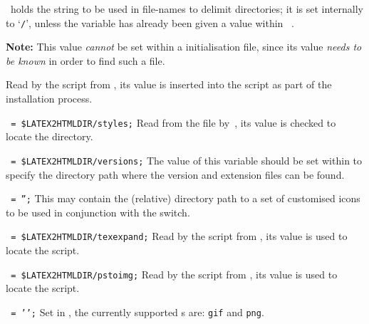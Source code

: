 \begin{htmllist}%
%
%
\item [\fn{\$dd} ]
~holds the string to be used in file-names to delimit directories;
it is set internally to `\texttt{/}', unless the variable has already been given
a value within ~.

\noindent
\textbf{Note:} This value \emph{cannot} be set within a 
initialisation file, since its value \emph{needs to be known}
in order to find such a file.

%
\item [\fn{\$LATEX2HTMLDIR}] \latex{ }%
Read by the  script from ,
its value is inserted into the  \Perl{} script as part
of the installation process.

\item [\fn{\$LATEX2HTMLSTYLES}\texttt{ = \char34\$LATEX2HTMLDIR/styles\char34;}]
Read from the  file by \,,
its value is checked to locate the  directory.

\item [\fn{\$LATEX2HTMLVERSIONS}\texttt{ = \char34\$LATEX2HTMLDIR/versions\char34;}]
The value of this variable should be set within 
to specify the directory path where the version and extension files can be found.

\item [\fn{\$ALTERNATIVE\_ICONS}\texttt{ = '';}\label{alticons}]
This may contain the (relative) directory path to a set of customised icons
to be used in conjunction with the  switch.

%
\item [\fn{\$TEXEXPAND}\texttt{  = \char34\$LATEX2HTMLDIR/texexpand\char34;}]
Read by the  \Perl{} script from ,
its value is used to locate the  \Perl{} script.

\item [\fn{\$PSTOIMG}\texttt{ = \char34\$LATEX2HTMLDIR/pstoimg\char34;}]
Read by the  \Perl{} script from ,
its value is used to locate the  \Perl{} script.

\item [\fn{\$IMAGE\_TYPE}\texttt{ = '\Meta{image-type}';}]
Set in , the currently supported s
are: \texttt{gif} and \texttt{png}.


\end{htmllist}
